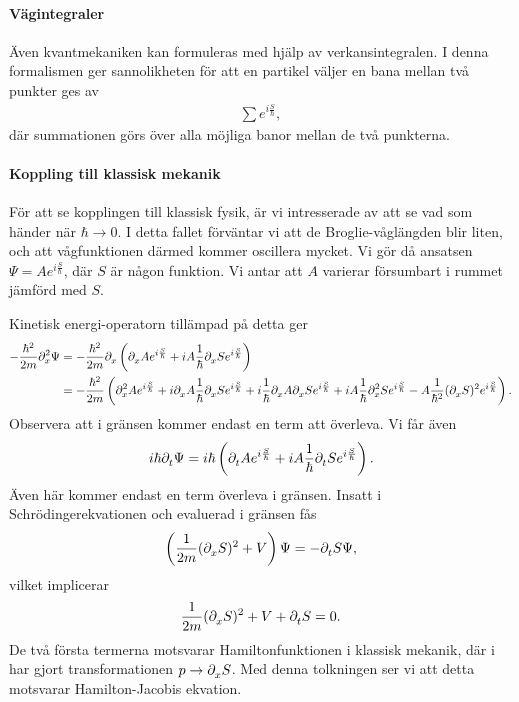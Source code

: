 \paragraph{Vägintegraler}
Även kvantmekaniken kan formuleras med hjälp av verkansintegralen. I denna formalismen ger sannolikheten för att en partikel väljer en bana mellan två punkter ges av
\begin{align*}
	\sum e^{i\frac{S}{\hbar}},
\end{align*}
där summationen görs över alla möjliga banor mellan de två punkterna.

\paragraph{Koppling till klassisk mekanik}
För att se kopplingen till klassisk fysik, är vi intresserade av att se vad som händer när $\hbar\to 0$. I detta fallet förväntar vi att de Broglie-våglängden blir liten, och att vågfunktionen därmed kommer oscillera mycket. Vi gör då ansatsen $\Psi = Ae^{i\frac{S}{\hbar}}$, där $S$ är någon funktion. Vi antar att $A$ varierar försumbart i rummet jämförd med $S$.

Kinetisk energi-operatorn tillämpad på detta ger
\begin{align*}
	-\frac{\hbar^{2}}{2m}\del[2]{x}{\Psi} &= -\frac{\hbar^{2}}{2m}\del{x}{\left(\del{x}{A}e^{i\frac{S}{\hbar}} + iA\frac{1}{\hbar}\del{x}{S}e^{i\frac{S}{\hbar}}\right)} \\
	                                      &=  -\frac{\hbar^{2}}{2m}\left(\del[2]{x}{A}e^{i\frac{S}{\hbar}} + i\del{x}{A}\frac{1}{\hbar}\del{x}{S}e^{i\frac{S}{\hbar}} + i\frac{1}{\hbar}\del{x}{A}\del{x}{S}e^{i\frac{S}{\hbar}} + iA\frac{1}{\hbar}\del[2]{x}{S}e^{i\frac{S}{\hbar}} - A\frac{1}{\hbar^{2}}(\del{x}{S})^{2}e^{i\frac{S}{\hbar}}\right).
\end{align*}
Observera att i gränsen kommer endast en term att överleva. Vi får även
\begin{align*}
	i\hbar\del{t}{\Psi} = i\hbar\left(\del{t}{A}e^{i\frac{S}{\hbar}} + iA\frac{1}{\hbar}\del{t}{S}e^{i\frac{S}{\hbar}}\right).
\end{align*}
Även här kommer endast en term överleva i gränsen. Insatt i Schrödingerekvationen och evaluerad i gränsen fås
\begin{align*}
	\left(\frac{1}{2m}(\del{x}{S})^{2} + V\right)\Psi = -\del{t}{S}\Psi,
\end{align*}
vilket implicerar
\begin{align*}
	\frac{1}{2m}(\del{x}{S})^{2} + V + \del{t}{S} = 0.
\end{align*}
De två första termerna motsvarar Hamiltonfunktionen i klassisk mekanik, där i har gjort transformationen $p\to\del{x}{S}$. Med denna tolkningen ser vi att detta motsvarar Hamilton-Jacobis ekvation.

